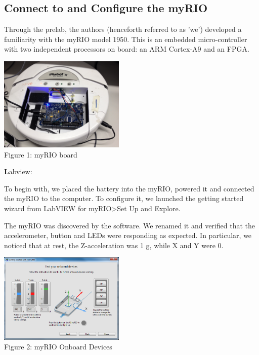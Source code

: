 \documentclass[twoside]{article}
\begin{document}
\begin{multicols}{2} %

\section{Connect to and Configure the myRIO}

Through the prelab, the authors (henceforth referred to as 'we') developed a familiarity with the myRIO model 1950. This is an embedded micro-controller with two independent processors on board: an ARM Cortex-A9 and an FPGA. 

\begin{center}
\includegraphics*[width = 6cm]{Fig1.jpg}\\
Figure 1: myRIO board
\end{center}

\textbf Labview:

To begin with, we placed the battery into the myRIO, powered it and connected the myRIO to the computer. To configure it, we launched the getting started wizard from LabVIEW for myRIO>Set Up and Explore.

The myRIO was discovered by the software. We renamed it and verified that the accelerometer, button and LEDs were responding as expected. In particular, we noticed that at rest, the Z-acceleration was 1 g, while X and Y were 0. 

\begin{center}
\includegraphics*[width = 6cm]{Fig2.png}\\
Figure 2: myRIO Onboard Devices
\end{center}


\end{multicols}
\end{document}
